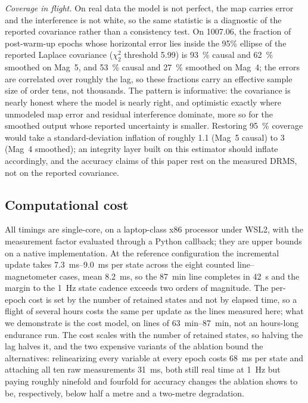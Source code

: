\documentclass{IEEEtaes}
\begin{document}
\emph{Coverage in flight.} On real data the model is not perfect, the map
carries error and the interference is not white, so the same statistic is a
diagnostic of the reported covariance rather than a consistency test. On
1007.06, the fraction of post-warm-up epochs whose horizontal error lies
inside the 95\% ellipse of the reported Laplace covariance
($\chi^2_2$ threshold \num{5.99}) is \SI{93}{\percent} causal and
\SI{62}{\percent} smoothed on Mag~5, and \SI{53}{\percent} causal and
\SI{27}{\percent} smoothed on Mag~4; the errors are correlated over roughly
the lag, so these fractions carry an effective sample size of order tens,
not thousands. The pattern is informative: the covariance is nearly honest
where the model is nearly right, and optimistic exactly where unmodeled map
error and residual interference dominate, more so for the smoothed output
whose reported uncertainty is smaller. Restoring \SI{95}{\percent} coverage
would take a standard-deviation inflation of roughly \num{1.1} (Mag~5
causal) to \num{3} (Mag~4 smoothed); an integrity layer built on this
estimator should inflate accordingly, and the accuracy claims of this paper
rest on the measured DRMS, not on the reported covariance.

\subsection{Computational cost}\label{sec:cost}
All timings are single-core, on a laptop-class x86 processor under WSL2, with
the measurement factor evaluated through a Python callback; they are upper
bounds on a native implementation. At the reference configuration the
incremental update takes \SIrange{7.3}{9.0}{\milli\second} per state across the
eight counted line--magnetometer cases, mean \SI{8.2}{\milli\second},
so the
\SI{87}{\minute} line completes in \SI{42}{\second} and the margin to the
\SI{1}{\hertz} state cadence exceeds two orders of magnitude. The per-epoch
cost is set by the number of retained states and not by elapsed time, so a
flight of several hours costs the same per update as the lines measured here;
what we demonstrate is the cost model, on lines of \SIrange{63}{87}{\minute},
not an hours-long endurance run. The cost scales
with the number of retained states, so halving the lag halves it, and the two
expensive variants of the ablation bound the alternatives: relinearizing every
variable at every epoch costs \SI{68}{\milli\second} per state and attaching
all ten raw measurements \SI{31}{\milli\second}, both still real time at
\SI{1}{\hertz} but paying roughly ninefold and fourfold for accuracy changes
the ablation shows to be, respectively, below half a metre and a two-metre
degradation.
\end{document}
